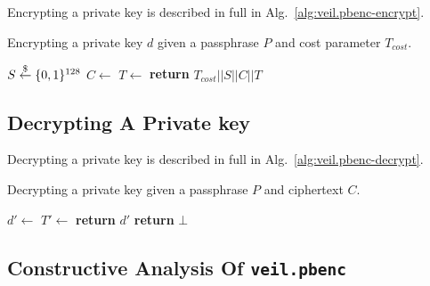 Encrypting a private key is described in full in Alg.~\ref{alg:veil.pbenc-encrypt}\@.

\begin{algorithm}[ht]
    \caption{
        Encrypting a private key $d$ given a passphrase $P$ and cost parameter $T_{cost}$.
    }
    \begin{algorithmic}
            \State $S \stackrel{\$}{\gets} \{0,1\}^{128}$
            \State {}
            \State $C \gets$
            \State $T \gets$
            \State \textbf{return} $T_{cost} || S || C || T$
        \EndFunction
    \end{algorithmic}
    \label{alg:veil.pbenc-encrypt}
\end{algorithm}

\subsection{Decrypting A Private key}\label{subsec:veil.pbenc-decrypt}

Decrypting a private key is described in full in Alg.~\ref{alg:veil.pbenc-decrypt}\@.

\begin{algorithm}[ht]
    \caption{
        Decrypting a private key given a passphrase $P$ and ciphertext $C$.
    }
    \begin{algorithmic}
            \State {}
            \State $d' \gets$
            \State $T' \gets$
            \State \textbf{return} $d'$
            \Else
                \State \textbf{return} $\bot$
            \EndIf
        \EndFunction
    \end{algorithmic}
    \label{alg:veil.pbenc-decrypt}
\end{algorithm}

\subsection{Constructive Analysis Of \texttt{veil.pbenc}}\label{subsec:veil.pbenc-analysis}

